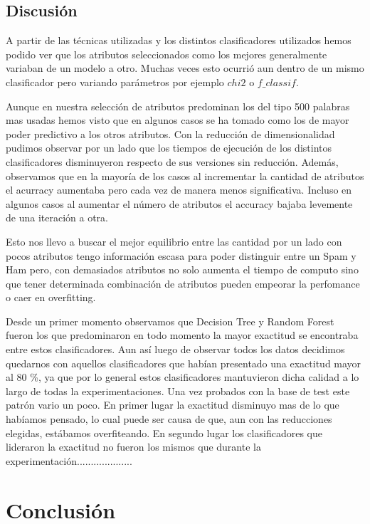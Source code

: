 \documentclass[a4paper]{article}
\begin{document}
\pagebreak
\subsection{Discusión}


  
A partir de las técnicas utilizadas y los distintos clasificadores utilizados hemos podido ver que los atributos seleccionados como los mejores generalmente variaban de un modelo a otro. Muchas veces esto ocurrió aun dentro de un mismo clasificador pero variando parámetros por ejemplo  $chi2$ o $f\_classif$. 

Aunque en nuestra selección de atributos predominan los del tipo 500 palabras mas usadas hemos visto que en algunos casos se ha tomado como los de mayor poder predictivo a los otros atributos. Con la reducción de dimensionalidad pudimos observar por un lado que los tiempos de ejecución de los distintos clasificadores disminuyeron respecto de sus versiones sin reducción. Además, observamos que en la mayoría de los casos al incrementar la cantidad de atributos el acurracy aumentaba pero cada vez de manera menos significativa. Incluso en algunos casos al aumentar el número de atributos el accuracy bajaba levemente de una iteración a otra.

 Esto nos llevo a buscar el mejor equilibrio entre las cantidad por un lado con pocos atributos tengo información escasa para poder distinguir entre un Spam y Ham pero, con demasiados atributos no solo aumenta el tiempo de computo sino que tener determinada combinación de atributos pueden empeorar la perfomance o caer en overfitting. 
 
Desde un primer momento observamos que Decision Tree y Random Forest fueron los que predominaron en todo momento la mayor exactitud se encontraba entre estos clasificadores. Aun así luego de observar todos los datos decidimos quedarnos con aquellos clasificadores que habían presentado una exactitud mayor al 80 \%, ya que por lo general estos clasificadores mantuvieron dicha calidad a lo largo de todas la experimentaciones. Una vez probados con la base de test este patrón vario un poco. En primer lugar la exactitud disminuyo mas de lo que habíamos pensado, lo cual puede ser causa de que, aun con las reducciones elegidas, estábamos  overfiteando. 
En segundo lugar los clasificadores que lideraron la exactitud no fueron los mismos que durante la experimentación....................

\section{Conclusión}
\end{document}
